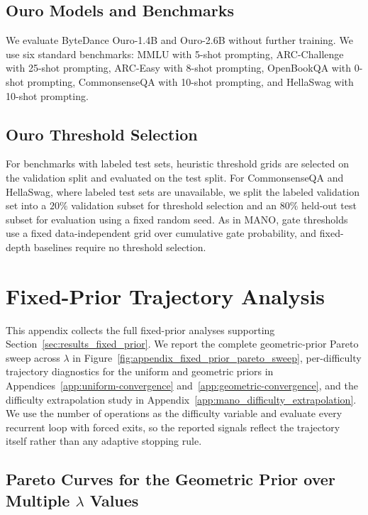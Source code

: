 \documentclass[10pt]{article} %
\begin{document}
\subsection{Ouro Models and Benchmarks}
We evaluate ByteDance Ouro-1.4B and Ouro-2.6B without further training. We use six standard benchmarks: MMLU with 5-shot prompting, ARC-Challenge with 25-shot prompting, ARC-Easy with 8-shot prompting, OpenBookQA with 0-shot prompting, CommonsenseQA with 10-shot prompting, and HellaSwag with 10-shot prompting. 

\subsection{Ouro Threshold Selection}
For benchmarks with labeled test sets, heuristic threshold grids are selected on the validation split and evaluated on the test split. For CommonsenseQA and HellaSwag, where labeled test sets are unavailable, we split the labeled validation set into a $20\%$ validation subset for threshold selection and an $80\%$ held-out test subset for evaluation using a fixed random seed. As in MANO, gate thresholds use a fixed data-independent grid over cumulative gate probability, and fixed-depth baselines require no threshold selection.

\section{Fixed-Prior Trajectory Analysis}
\label{app:fixed_prior_difficulty}

This appendix collects the full fixed-prior analyses supporting Section~\ref{sec:results_fixed_prior}. We report the complete geometric-prior Pareto sweep across \(\lambda\) in Figure~\ref{fig:appendix_fixed_prior_pareto_sweep}, per-difficulty trajectory diagnostics for the uniform and geometric priors in Appendices~\ref{app:uniform-convergence} and~\ref{app:geometric-convergence}, and the difficulty extrapolation study in Appendix~\ref{app:mano_difficulty_extrapolation}. We use the number of operations as the difficulty variable and evaluate every recurrent loop with forced exits, so the reported signals reflect the trajectory itself rather than any adaptive stopping rule.

\subsection{\texorpdfstring
    {Pareto Curves for the Geometric Prior over Multiple $\lambda$ Values}
    {Pareto Curves for the Geometric Prior over Multiple Lambda Values}}
    
\end{document}
